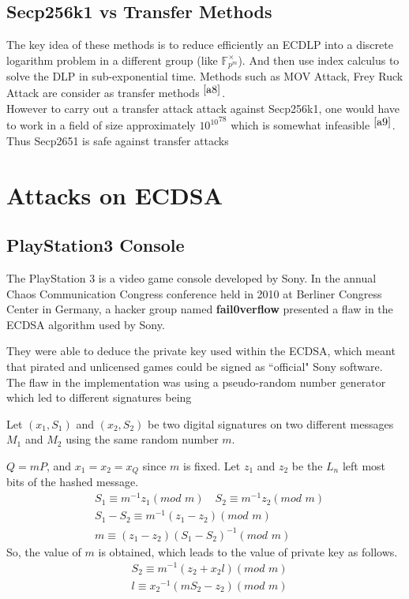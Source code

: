 \subsection{Secp256k1 vs Transfer Methods}
 The key idea of these methods is to reduce efficiently an ECDLP into a discrete logarithm problem in a different group (like $\mathbb{F}^\times_{p^m}$). And then use index calculus to solve the DLP in sub-exponential time. Methods such as MOV Attack, Frey Ruck Attack are consider as transfer methods $^{\cite{a8}}$.\\ %
However to carry out a transfer attack attack against Secp256k1, one would have
to work in a field of size approximately ${10^{10}}^{78}$ %
which is somewhat infeasible $^{\cite{a9}}$. Thus Secp2651 is safe against transfer attacks

\section{Attacks on ECDSA}


\subsection{PlayStation3 Console}
\indent The PlayStation 3 is a video game console developed by Sony. In the annual Chaos Communication Congress conference held in 2010 at Berliner Congress Center in Germany, a hacker group named \textbf{fail0verflow} presented a flaw in the ECDSA algorithm used by Sony. 

They were able to deduce the private key used within the ECDSA, which meant that pirated and unlicensed games could be signed as ``official" Sony software.  The flaw in the implementation was using a pseudo-random number generator which led to different signatures being 

Let $(x_1, S_1)$ and $(x_2, S_2)$ be two digital signatures on two different messages $M_1$ and $M_2$ using the same random number $m$. 

$Q = mP$, and $x_1 = x_2 = x_Q$ since $m$ is fixed. 
Let $z_1$ and $z_2$ be the $L_n$ left most bits of the hashed message. 
\begin{align*} 
&S_1 \equiv m^{-1} z_1 (mod \,\, m) \quad S_2 \equiv m^{-1} z_2 (mod \,\, m) \\
&S_1 - S_2 \equiv m^{-1} (z_1 - z_2) (mod \,\, m) \\
& m \equiv (z_1 - z_2)(S_1 - S_2)^{-1} (mod \,\, m)
\end{align*}
So, the value of $m$ is obtained, which leads to the value of private key as follows. 
\begin{align*}
    &S_2 \equiv m^{-1} (z_2 + x_2 l) (mod \,\, m) \\
    &l \equiv {x_2}^{-1} (m S_2 - z_2) (mod \,\, m) 
\end{align*}

